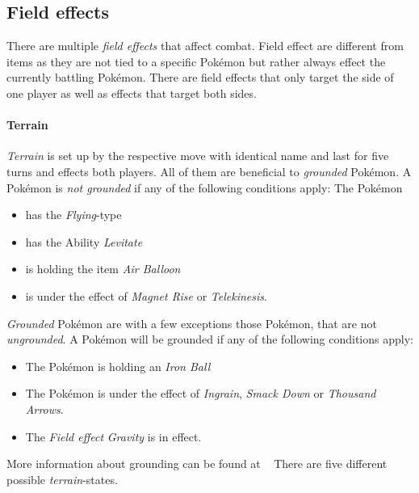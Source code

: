 \subsection{Field effects}
\label{sec:field-effects}
There are multiple \textit{field effects} that affect combat. Field effect are different from items as they are not
tied to a specific Pokémon but rather always effect the currently battling Pokémon. There are field effects that only
target the side of one player as well as effects that target both sides. 
\paragraph{Terrain}
\textit{Terrain} is set up by the respective move with identical name and last for five turns and effects both players.
All of them are beneficial to \textit{grounded} Pokémon. A Pokémon is \textit{not grounded} if any of the 
following conditions apply: The Pokémon
\begin{itemize}
	\item has the \textit{Flying}-type
	\item has the Ability \textit{Levitate}
	\item is holding the item \textit{Air Balloon}
	\item is under the effect of \textit{Magnet Rise} or \textit{Telekinesis}.
\end{itemize}
\textit{Grounded} Pokémon are with a few exceptions those Pokémon, that are not \textit{ungrounded}. A 
Pokémon will be grounded if any of the following conditions apply:
\begin{itemize}
	\item The Pokémon is holding an \textit{Iron Ball}
	\item The Pokémon is under the effect of \textit{Ingrain}, \textit{Smack Down} or \textit{Thousand Arrows}.
	\item The \textit{Field effect} \textit{Gravity} is in effect.
\end{itemize}
More information about grounding can be found at ~\autocite{Bulbapedia:Grounded}
There are five different possible \textit{terrain}-states. 
